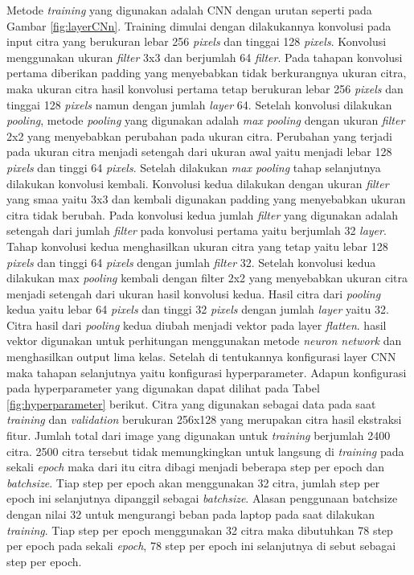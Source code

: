 Metode \emph{training} yang digunakan adalah CNN dengan urutan seperti pada Gambar \ref{fig:layerCNn}. Training dimulai dengan dilakukannya konvolusi pada input citra yang berukuran lebar 256 \emph{pixels} dan tinggai 128 \emph{pixels}. Konvolusi menggunakan ukuran \emph{filter} 3x3 dan berjumlah 64 \emph{filter}. Pada tahapan konvolusi pertama diberikan padding yang menyebabkan tidak berkurangnya ukuran citra, maka ukuran citra hasil konvolusi pertama tetap berukuran lebar 256 \emph{pixels} dan tinggai 128 \emph{pixels} namun dengan jumlah \emph{layer} 64. Setelah konvolusi dilakukan \emph{pooling}, metode \emph{pooling} yang digunakan adalah \emph{max pooling} dengan ukuran \emph{filter} 2x2 yang menyebabkan perubahan pada ukuran citra. Perubahan yang terjadi pada ukuran citra menjadi setengah dari ukuran awal yaitu menjadi lebar 128 \emph{pixels} dan tinggi 64 \emph{pixels}. Setelah dilakukan \emph{max pooling} tahap selanjutnya dilakukan konvolusi kembali. Konvolusi kedua dilakukan dengan ukuran \emph{filter} yang smaa yaitu 3x3 dan kembali digunakan padding yang menyebabkan ukuran citra tidak berubah. Pada konvolusi kedua jumlah \emph{filter} yang digunakan adalah setengah dari jumlah \emph{filter} pada konvolusi pertama yaitu berjumlah 32 \emph{layer}. Tahap konvolusi kedua menghasilkan ukuran citra yang tetap yaitu lebar 128 \emph{pixels} dan tinggi 64 \emph{pixels} dengan jumlah \emph{filter} 32. Setelah konvolusi kedua dilakukan max \emph{pooling} kembali dengan filter 2x2 yang menyebabkan ukuran citra menjadi setengah dari ukuran hasil konvolusi kedua. Hasil citra dari \emph{pooling} kedua yaitu lebar 64 \emph{pixels} dan tinggi 32 \emph{pixels} dengan jumlah \emph{layer} yaitu 32. Citra hasil dari \emph{pooling} kedua diubah menjadi vektor pada layer \emph{flatten}. hasil vektor digunakan untuk perhitungan menggunakan metode \emph{neuron network} dan menghasilkan output lima kelas. Setelah di tentukannya konfigurasi layer CNN maka tahapan selanjutnya yaitu konfigurasi hyperparameter. Adapun konfigurasi pada hyperparameter yang digunakan dapat dilihat pada Tabel \ref{fig:hyperparameter} berikut. Citra yang digunakan sebagai data pada saat \emph{training} dan \emph{validation} berukuran 256x128 yang merupakan citra hasil ekstraksi fitur. Jumlah total dari image yang digunakan untuk \emph{training} berjumlah 2400 citra. 2500 citra tersebut tidak memungkingkan untuk langsung di \emph{training} pada sekali \emph{epoch} maka dari itu citra dibagi menjadi beberapa step per epoch dan \emph{batchsize}. Tiap step per epoch akan menggunakan 32 citra, jumlah step per epoch ini selanjutnya dipanggil sebagai \emph{batchsize}. Alasan penggunaan batchsize dengan nilai 32 untuk mengurangi beban pada laptop pada saat dilakukan \emph{training}. Tiap step per epoch menggunakan 32 citra maka dibutuhkan 78 step per epoch pada sekali \emph{epoch}, 78 step per epoch ini selanjutnya di sebut sebagai step per epoch.


